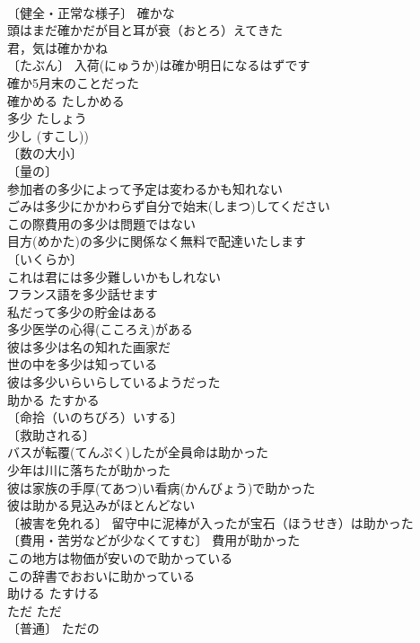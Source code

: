 \documentclass[8pt]{extreport}
\begin{document}
\begin{CJK}{UTF8}{min}
\\	〔健全・正常な様子〕 確かな 
\\	頭はまだ確かだが目と耳が衰（おとろ）えてきた 
\\	君，気は確かかね 
\\	〔たぶん〕 入荷(にゅうか)は確か明日になるはずです 
\\	確か5月末のことだった 
\\	確かめる	たしかめる	
\\	多少	たしょう	
\\	少し (すこし)) 
\\	〔数の大小〕
\\	〔量の〕
\\	参加者の多少によって予定は変わるかも知れない 
\\	ごみは多少にかかわらず自分で始末(しまつ)してください 
\\	この際費用の多少は問題ではない 
\\	目方(めかた)の多少に関係なく無料で配達いたします 
\\	〔いくらか〕
\\	これは君には多少難しいかもしれない 
\\	フランス語を多少話せます 
\\	私だって多少の貯金はある 
\\	多少医学の心得(こころえ)がある 
\\	彼は多少は名の知れた画家だ 
\\	世の中を多少は知っている 
\\	彼は多少いらいらしているようだった 
\\	助かる	たすかる	
\\	〔命拾（いのちびろ）いする〕
\\	〔救助される〕
\\	バスが転覆(てんぷく)したが全員命は助かった 
\\	少年は川に落ちたが助かった 
\\	彼は家族の手厚(てあつ)い看病(かんびょう)で助かった 
\\	彼は助かる見込みがほとんどない 
\\	〔被害を免れる〕 留守中に泥棒が入ったが宝石（ほうせき）は助かった 
\\	〔費用・苦労などが少なくてすむ〕 費用が助かった 
\\	この地方は物価が安いので助かっている 
\\	この辞書でおおいに助かっている 
\\	助ける	たすける	
\\	ただ	ただ	
\\	〔普通〕 ただの 

\end{CJK}
\end{document}
